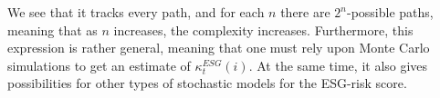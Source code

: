 We see that it tracks every path, and for each $n$ there are $2^{n}$-possible paths, meaning that as $n$ increases, the complexity increases. Furthermore, this expression is rather general, meaning that one must rely upon Monte Carlo simulations to get an estimate of $\kappa_{t}^{ESG}(i)$. At the same time, it also gives possibilities for other types of stochastic models for the ESG-risk score. 




